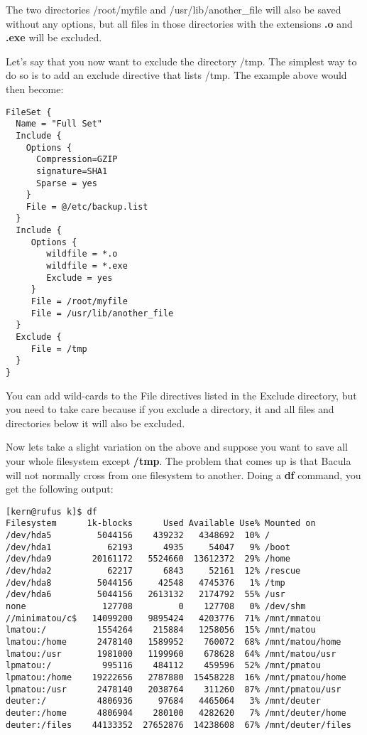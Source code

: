 The two directories /root/myfile and /usr/lib/another\_file will also be saved
without any options, but all files in those directories with the extensions
{\bf .o} and {\bf .exe} will be excluded. 

Let's say that you now want to exclude the directory /tmp. The simplest way
to do so is to add an exclude directive that lists /tmp.  The example
above would then become:

\footnotesize 
\begin{verbatim}
FileSet {
  Name = "Full Set"
  Include {
    Options {
      Compression=GZIP
      signature=SHA1
      Sparse = yes
    }
    File = @/etc/backup.list
  }
  Include {
     Options {
        wildfile = *.o
        wildfile = *.exe
        Exclude = yes
     }
     File = /root/myfile
     File = /usr/lib/another_file
  }
  Exclude {
     File = /tmp
  }
}
\end{verbatim}
\normalsize


You can add wild-cards to the File directives listed in the Exclude
directory, but you need to take care because if you exclude a directory,
it and all files and directories below it will also be excluded.

Now lets take a slight variation on the above and suppose
you want to save all your whole filesystem except {\bf /tmp}. 
The problem that comes up is that Bacula will not normally
cross from one filesystem to another.
Doing a {\bf df} command, you get the following output: 

\footnotesize
\begin{verbatim}
[kern@rufus k]$ df
Filesystem      1k-blocks      Used Available Use% Mounted on
/dev/hda5         5044156    439232   4348692  10% /
/dev/hda1           62193      4935     54047   9% /boot
/dev/hda9        20161172   5524660  13612372  29% /home
/dev/hda2           62217      6843     52161  12% /rescue
/dev/hda8         5044156     42548   4745376   1% /tmp
/dev/hda6         5044156   2613132   2174792  55% /usr
none               127708         0    127708   0% /dev/shm
//minimatou/c$   14099200   9895424   4203776  71% /mnt/mmatou
lmatou:/          1554264    215884   1258056  15% /mnt/matou
lmatou:/home      2478140   1589952    760072  68% /mnt/matou/home
lmatou:/usr       1981000   1199960    678628  64% /mnt/matou/usr
lpmatou:/          995116    484112    459596  52% /mnt/pmatou
lpmatou:/home    19222656   2787880  15458228  16% /mnt/pmatou/home
lpmatou:/usr      2478140   2038764    311260  87% /mnt/pmatou/usr
deuter:/          4806936     97684   4465064   3% /mnt/deuter
deuter:/home      4806904    280100   4282620   7% /mnt/deuter/home
deuter:/files    44133352  27652876  14238608  67% /mnt/deuter/files
\end{verbatim}
\normalsize

